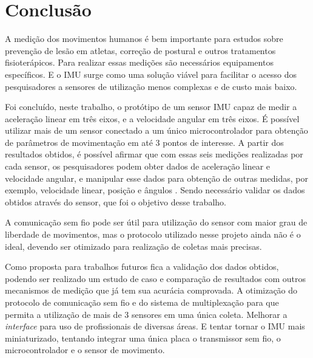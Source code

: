 \chapter{Conclusão}
	
	A medição dos movimentos  humanos é bem importante para estudos sobre prevenção de lesão em atletas, correção de postural e outros tratamentos fisioterápicos. Para realizar essas medições são necessários equipamentos específicos. E o IMU surge como uma solução viável para facilitar o acesso dos pesquisadores a sensores de utilização menos complexas e de custo mais baixo. 
	
	Foi concluído, neste trabalho, o protótipo de um sensor IMU capaz de medir a aceleração linear em três eixos, e a velocidade angular em três eixos. É possível utilizar mais de um sensor conectado a um único microcontrolador para obtenção de parâmetros de movimentação em até 3 pontos de interesse. A partir dos resultados obtidos, é possível afirmar que com essas seis medições realizadas por cada sensor, os pesquisadores podem obter dados de aceleração linear e velocidade angular, e manipular esse dados para obtenção de outras medidas, por exemplo, velocidade linear, posição e ângulos . Sendo necessário validar os dados obtidos através do sensor, que foi o objetivo desse trabalho.
	
	A comunicação sem fio pode ser útil para utilização do sensor com maior grau de liberdade de movimentos, mas o protocolo utilizado nesse projeto ainda não é o ideal, devendo ser otimizado para realização de coletas mais precisas. 
	
	Como proposta para trabalhos futuros fica a validação dos dados obtidos, podendo ser realizado um estudo de caso e comparação de resultados com outros mecanismos de medição que já tem sua acurácia comprovada. A otimização do protocolo de comunicação sem fio e do sistema de multiplexação para que permita a utilização de mais de 3 sensores em uma única coleta. Melhorar a \textit{interface}  para uso de profissionais de diversas áreas. E tentar tornar o IMU mais miniaturizado, tentando integrar uma única placa o transmissor sem fio, o microcontrolador e o sensor de movimento.
